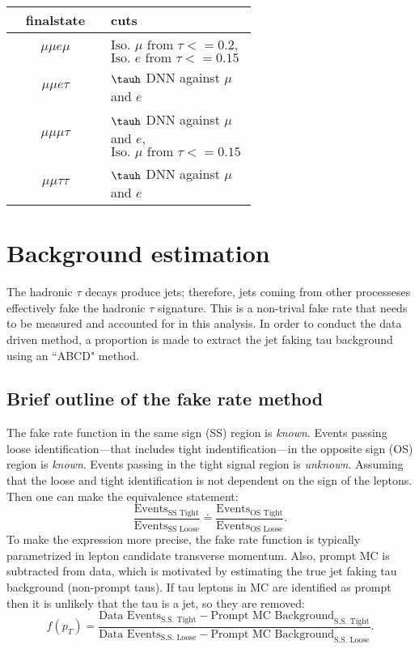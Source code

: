 \begin{table}[h!tbp]
\centering
{}
\begin{tabular*}{0.8\textwidth}{c|p{0.6\linewidth}}
\hline
finalstate          & cuts \\\hline 
$\mu\mu e \mu$    &    $\text{Iso. $\mu$ from $\tau$} <= 0.2$, $\text{Iso. $e$ from $\tau$} <= 0.15$       \\\hline
$\mu\mu e \tau$   &   $\tauh$ DNN against $\mu$ and $e$        \\\hline
$\mu\mu\mu\tau$   &   $\tauh$ DNN against $\mu$ and $e$,$\text{Iso. $\mu$ from $\tau$} <= 0.15$        \\\hline
$\mu\mu\tau\tau$  &   $\tauh$ DNN against $\mu$ and $e$       \\\hline
\end{tabular*}
\end{table}


\section{Background estimation}
\label{sec:background}
The hadronic $\tau$ decays produce jets; therefore, jets coming from other processeses effectively fake the hadronic $\tau$ signature. This is a non-trival fake rate that needs to be measured and accounted for in this analysis. 
In order to conduct the data driven method, a proportion is made to extract the jet faking tau background using an ``ABCD" method. 
\subsection{Brief outline of the fake rate method}
The fake rate function in the same sign (SS) region is \textit{known}.
Events passing loose identification---that includes tight indentification---in the opposite sign (OS) region is \textit{known}.
Events passing in the tight signal region is \textit{unknown}. 
Assuming that the loose and tight identification is not dependent on the sign of the leptons. Then one can make the equivalence statement: 
\begin{equation}
\label{eq:abcd}
\frac{\text{Events}_\text{SS Tight}}{\text{Events}_\text{SS Loose}} \doteq \frac{\text{Events}_\text{OS Tight}}{\text{Events}_\text{OS Loose}}
\text{.}
\end{equation}
To make the expression more precise, the fake rate function is typically parametrized in lepton candidate transverse momentum. 
 Also, prompt MC is subtracted from data, which is motivated by estimating the true jet faking tau background (non-prompt taus). If tau leptons in MC are identified as prompt then it is unlikely that the tau is a jet, so they are removed: 
\begin{equation}
f(p_T)=\frac{\text{Data Events}_\text{S.S. Tight} - \text{Prompt MC Background}_\text{S.S. Tight}}{{\text{Data Events}_\text{S.S. Loose} - \text{Prompt MC Background}_\text{S.S. Loose}}}
\text{.}
\end{equation} 

